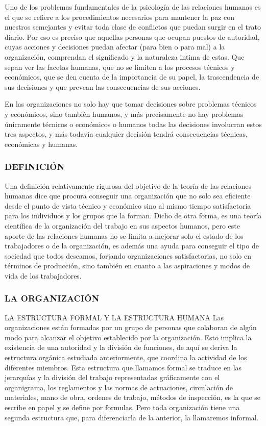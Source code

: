 Uno de los problemas fundamentales de la psicología de las relaciones humanas es el que se refiere a los procedimientos necesarios para mantener la paz con nuestros semejantes y evitar toda clase de conflictos que puedan surgir en el trato diario. Por eso es preciso que aquellas personas que ocupan puestos de autoridad, cuyas acciones y decisiones puedan afectar (para bien o para mal) a la organización, comprendan el significado y la naturaleza intima de estas. Que sepan ver las facetas humanas, que no se limiten a los procesos técnicos y económicos, que se den cuenta de la importancia de su papel, la trascendencia de sus decisiones y que prevean las consecuencias de sus acciones.

En las organizaciones no solo hay que tomar decisiones sobre problemas técnicos y económicos, sino también humanos, y más precisamente no hay problemas únicamente técnicos o económicos o humanos todas las decisiones involucran estos tres aspectos, y más todavía cualquier decisión tendrá consecuencias técnicas, económicas y humanas.

\subsubsection*{DEFINICIÓN}
Una definición relativamente rigurosa del objetivo de la teoría de las relaciones humanas dice que procura conseguir una organización que no solo sea eficiente desde el punto de vista técnico y económico sino al mismo tiempo satisfactoria para los individuos y los grupos que la forman. Dicho de otra forma, es una teoría científica de la organización del trabajo en sus aspectos humanos, pero este aporte de las relaciones humanas no se limita a mejorar solo el estado de los trabajadores o de la organización, es además una ayuda para conseguir el tipo de sociedad que todos deseamos, forjando organizaciones satisfactorias, no solo en términos de producción, sino también en cuanto a las aspiraciones y modos de vida de los trabajadores.

\subsubsection*{LA ORGANIZACIÓN}
LA ESTRUCTURA FORMAL Y LA ESTRUCTURA HUMANA Las organizaciones están formadas por un grupo de personas que colaboran de algún modo para alcanzar el objetivo establecido por la organización. Esto implica la existencia de una autoridad y la división de funciones, de aquí se deriva la estructura orgánica estudiada anteriormente, que coordina la actividad de los diferentes miembros. Esta estructura que llamamos formal se traduce en las jerarquías y la división del trabajo representadas gráficamente con el organigrama, los reglamentos y las normas de actuaciones, circulación de materiales, mano de obra, ordenes de trabajo, métodos de inspección, es la que se escribe en papel y se define por formulas. Pero toda organización tiene una segunda estructura que, para diferenciarla de la anterior, la llamaremos informal.

